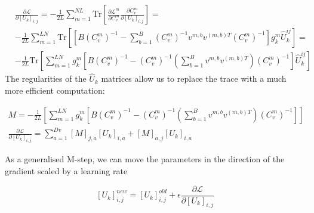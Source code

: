 \documentclass{paper}
\begin{document}
\begin{equation}
\begin{split}
&\frac{\partial \mathcal{L}}{\partial \left[ U_k \right]_{i,j}} = -\frac{1}{2L} \sum_{m=1}^{NL} \textrm{Tr} \left[ \frac{\partial \mathcal{L}^m}{\partial C_v^m} \frac{\partial C_v^m}{\partial \left[ U_k \right]_{i,j}} \right] = \\
& -\frac{1}{2L} \sum_{m=1}^{LN} \textrm{Tr} \left[  \left[ B \left( C_v^m \right)^{-1} - \sum_{b=1}^B \left( C_v^m \right)^{-1} v^{m,b} v^{(m,b)T} \left( C_v^m \right)^{-1} \right] g_k^{m} \hat U_k^{ij} \right] = \\
& -\frac{1}{2L} \textrm{Tr} \left[ \sum_{m=1}^{LN} g_k^{m} \left[ B \left( C_v^m \right)^{-1} -  \left( C_v^m \right)^{-1} \left( \sum_{b=1}^B v^{m,b} v^{(m,b)T} \right) \left( C_v^m \right)^{-1} \right] \hat U_k^{ij} \right]
\end{split}
\end{equation}
%
The regularities of the $\hat U_k$ matrices allow us to replace the trace with a much more efficient computation:

\begin{eqnarray}
M = -\frac{1}{2L} \left[ \sum_{m=1}^{LN} g_k^{m} \left[ B \left( C_v^m \right)^{-1} -  \left( C_v^m \right)^{-1} \left( \sum_{b=1}^B v^{m,b} v^{(m,b)T} \right) \left( C_v^m \right)^{-1} \right]\right] \\
\frac{\partial \mathcal{L}}{\partial \left[ U_k \right]_{i,j}} = \sum_{a=1}^{Dv} \left[ M \right]_{j,a} \left[ U_k \right]_{i,a} + \left[ M \right]_{a,j} \left[ U_k \right]_{i,a}
\end{eqnarray}

As a generalised M-step, we can move the parameters in the direction of the gradient scaled by a learning rate

\begin{equation}
\left[ U_k \right]_{i,j}^{new} = \left[ U_k \right]_{i,j}^{old} + \epsilon \frac{\partial \mathcal{L}}{\partial \left[ U_k \right]_{i,j}}
\end{equation}
\end{document}
